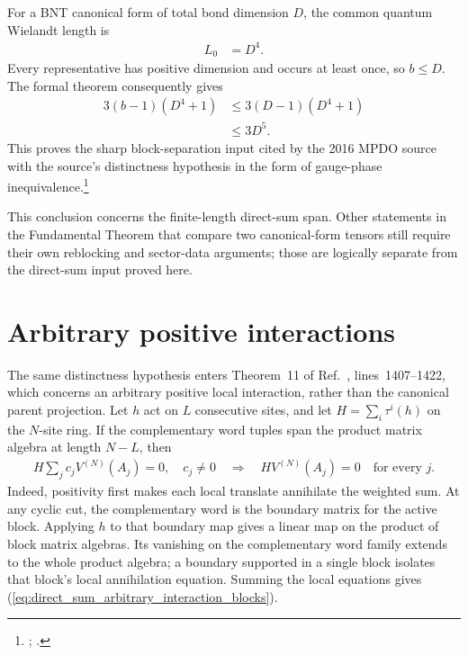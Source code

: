 \documentclass{article}
\begin{document}
For a BNT canonical form of total bond dimension $D$, the common quantum
Wielandt length is
\begin{align}
    L_0
     & =D^4.
    \label{eq:direct-sum_quantum_wielandt_length}
\end{align}
Every representative has positive dimension and occurs at least once, so
$b\leq D$. The formal theorem consequently gives
\begin{align}
    3(b-1)(D^4+1)
     & \leq 3(D-1)(D^4+1)
    \label{eq:direct-sum_basis_count_dimension_bound} \\
     & \leq 3D^5.
    \label{eq:direct-sum_total_dimension_length_bound}
\end{align}
This proves the sharp block-separation input cited by the 2016 MPDO source
with the source's distinctness hypothesis in the form of gauge-phase
inequivalence.\footnote{%
    ;
    .}

This conclusion concerns the finite-length direct-sum span. Other statements
in the Fundamental Theorem that compare two canonical-form tensors still
require their own reblocking and sector-data arguments; those are logically
separate from the direct-sum input proved here.

\section{Arbitrary positive interactions}

The same distinctness hypothesis enters Theorem~11 of
Ref.~\cite{PerezGarcia2007MPSReps}, lines~1407--1422, which concerns an arbitrary
positive local interaction, rather than the canonical parent projection.
Let $h$ act on $L$ consecutive sites, and let $H=\sum_i\tau^i(h)$ on the
$N$-site ring. If the complementary word tuples span the product matrix
algebra at length $N-L$, then
\begin{align}
    H\sum_j c_j V^{(N)}(A_j)=0,\quad c_j\ne0
    \quad\Longrightarrow\quad
    HV^{(N)}(A_j)=0\quad\text{for every }j.
    \label{eq:direct_sum_arbitrary_interaction_blocks}
\end{align}
Indeed, positivity first makes each local translate annihilate the weighted
sum. At any cyclic cut, the complementary word is the boundary matrix for the
active block. Applying $h$ to that boundary map gives a linear map on the
product of block matrix algebras. Its vanishing on the complementary word
family extends to the whole product algebra; a boundary supported in a single
block isolates that block's local annihilation equation. Summing the local
equations gives (\ref{eq:direct_sum_arbitrary_interaction_blocks}).
\end{document}
